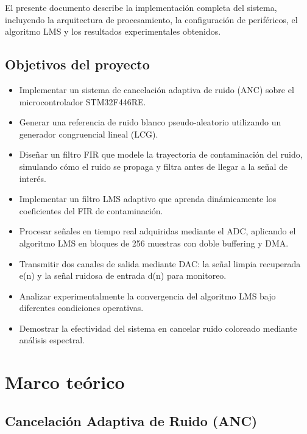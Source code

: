 \documentclass[12pt]{article}
\begin{document}
		El presente documento describe la implementación completa del sistema, incluyendo la arquitectura de procesamiento, la configuración de periféricos, el algoritmo LMS y los resultados experimentales obtenidos.

		\subsection{Objetivos del proyecto}
		
			\begin{itemize}
			\item Implementar un sistema de cancelación adaptiva de ruido (ANC) sobre el microcontrolador STM32F446RE.
			
			\item Generar una referencia de ruido blanco pseudo-aleatorio utilizando un generador congruencial lineal (LCG).
			
			\item Diseñar un filtro FIR que modele la trayectoria de contaminación del ruido, simulando cómo el ruido se propaga y filtra antes de llegar a la señal de interés.
			
			\item Implementar un filtro LMS adaptivo que aprenda dinámicamente los coeficientes del FIR de contaminación.
			
			\item Procesar señales en tiempo real adquiridas mediante el ADC, aplicando el algoritmo LMS en bloques de 256 muestras con doble buffering y DMA.
			
			\item Transmitir dos canales de salida mediante DAC: la señal limpia recuperada e(n) y la señal ruidosa de entrada d(n) para monitoreo.
			
			\item Analizar experimentalmente la convergencia del algoritmo LMS bajo diferentes condiciones operativas.
			
			\item Demostrar la efectividad del sistema en cancelar ruido coloreado mediante análisis espectral.
			
			\end{itemize}
			
	\section{Marco teórico}

		\subsection{Cancelación Adaptiva de Ruido (ANC)}
\end{document}
